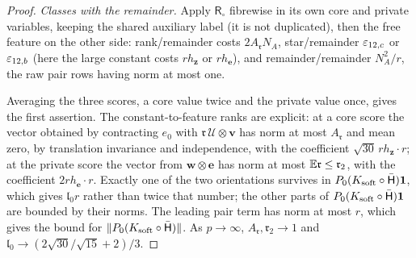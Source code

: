 \begin{proof}
\emph{Classes with the remainder.} Apply $\mathsf R_\circ$ fibrewise in its own core and
private variables, keeping the shared auxiliary label (it is not duplicated), then the free
feature on the other side: rank/remainder costs $2A_{\mathfrak r}N_A$, star/remainder
$\varepsilon_{12,c}$ or $\varepsilon_{12,b}$ (here the large constant costs $rh_{\mathbf z}$ or
$rh_{\mathbf e}$), and remainder/remainder $N_A^2/r$, the raw pair rows having norm at most
one.

Averaging the three scores, a core value twice and the private value once, gives the
first assertion. The constant-to-feature ranks are explicit: at a core score the vector
obtained by contracting $e_0$ with $\mathfrak r\,\mathcal U\otimes\mathbf v$ has norm at most
$A_{\mathfrak r}$ and mean zero, by translation invariance and independence, with the
coefficient $\sqrt{30}\,rh_{\mathbf z}\cdot r$; at the private score the vector from
$\mathbf w\otimes\mathbf e$ has norm at most $\mathbb E\mathfrak r\le\mathfrak r_2$, with the
coefficient $2rh_{\mathbf e}\cdot r$. Exactly one of the two orientations survives in
$P_0(K_{\rm soft}\circ\bar{\mathsf H})\mathbf 1$, which gives $\mathfrak l_0r$ rather than twice that
number; the other parts of $P_0(K_{\rm soft}\circ\bar{\mathsf H})\mathbf 1$ are bounded by their norms. The
leading pair term has norm at most $r$, which gives the bound for
$\|P_0(K_{\rm soft}\circ\bar{\mathsf H})\|$. As $p\to\infty$, $A_{\mathfrak r},\mathfrak r_2\to1$ and
$\mathfrak l_0\to(2\sqrt{30}/\sqrt{15}+2)/3$.
\end{proof}

